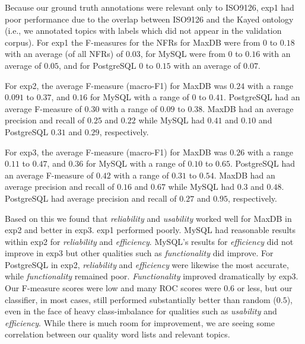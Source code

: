 \documentclass[smallextended]{svjour3}       %
\begin{document}
Because our ground truth annotations were relevant only to ISO9126,
 \textsf{exp1} had poor
performance due to the overlap between ISO9126 and the Kayed ontology (i.e., we annotated topics with labels which did not appear in the validation corpus). 
For \textsf{exp1} the F-measures for the NFRs for MaxDB were from $0$ to $0.18$ with an average (of all NFRs)
of $0.03$, for MySQL were from $0$ to $0.16$ with an average of
$0.05$, and for PostgreSQL $0$ to $0.15$ with an average of $0.07$. 




For \textsf{exp2}, the average F-measure (macro-F1) for MaxDB was  $0.24$ with a range $0.091$ to
$0.37$, and $0.16$ for MySQL with a range of $0$ to $0.41$. PostgreSQL had an average F-measure of $0.30$ %
 with a range of $0.09$ to $0.38$.
MaxDB had an average precision and recall of $0.25$ and $0.22$
while MySQL had $0.41$ and $0.10$ and PostgreSQL $0.31$ and $0.29$, respectively.

For \textsf{exp3}, the average F-measure (macro-F1) for MaxDB was $0.26$ with a range $0.11$ to
$0.47$, and $0.36$ for MySQL with a range of $0.10$ to $0.65$. 
PostgreSQL had an average F-measure of $0.42$ with a range of $0.31$ to $0.54$.
MaxDB had an average precision and recall of $0.16$ and $0.67$
while MySQL had $0.3$ and $0.48$. PostgreSQL had average precision and recall of $0.27$ and $0.95$, respectively.

Based on this we found that \emph{reliability} and
\emph{usability} worked well for MaxDB in \textsf{exp2} and better in
\textsf{exp3}. 
\textsf{exp1} performed poorly.
MySQL had reasonable results within \textsf{exp2} for \emph{reliability} and \emph{efficiency}. 
MySQL's results for \emph{efficiency} did not improve in \textsf{exp3}
but other qualities such as \emph{functionality} did improve. 
For PostgreSQL in \textsf{exp2}, \emph{reliability} and \emph{efficiency} were likewise the most accurate,
while \emph{functionality} remained poor. \emph{Functionality} improved dramatically by \textsf{exp3}.
Our F-measure scores were low and many ROC scores were $0.6$ or less, but our classifier, in most cases,
still performed substantially better than random ($0.5$), even in the
face of heavy class-imbalance for qualities such as \emph{usability} 
and \emph{efficiency}. While there is much room for improvement, we are seeing some
correlation between our quality word lists and relevant topics.
\end{document}
